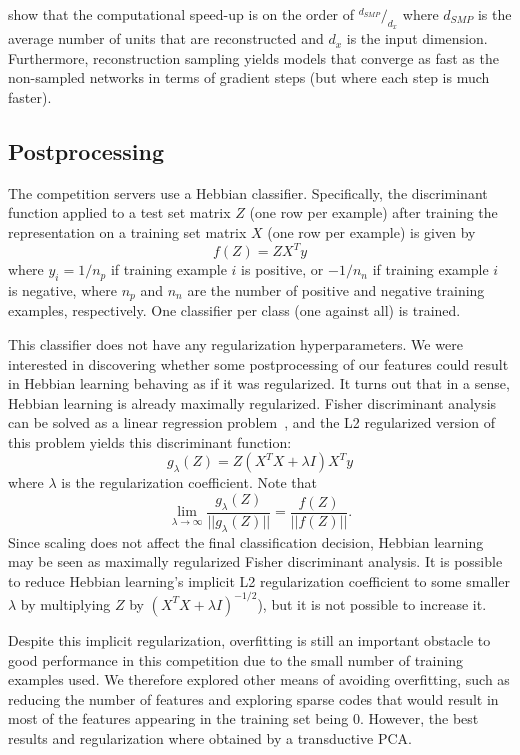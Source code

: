\cite{Dauphin+al-2011} show that the computational speed-up is on the order of
$^{d_{SMP}}/_{d_x}$ where $d_{SMP}$ is the average number of units that are
reconstructed and $d_x$ is the input dimension. Furthermore, reconstruction sampling
yields models that converge as fast as the non-sampled networks in terms of gradient steps
(but where each step is much faster).


\subsection{Postprocessing}

The competition servers use a Hebbian classifier. Specifically,
the discriminant function applied to a test set matrix 
$Z$ (one row per example) after training
the representation on a training set matrix $X$ (one row per example) is given by
\[ f(Z) = Z X^T y \]
where $y_i = 1 / n_p$ if training example $i$ is positive,
or $-1/n_n$ if training example $i$ is negative, where $n_p$ and $n_n$
are the number of positive and negative training examples, respectively.
One classifier per class (one against all) is trained.

This classifier does not have any regularization hyperparameters.
We were interested in discovering whether some postprocessing of our
features could result in Hebbian learning behaving as if it was regularized.
It turns out that in a sense, Hebbian learning is already maximally
regularized. Fisher discriminant analysis can be solved as a linear
regression problem~\citep{bishop-book2006}, and the L2 regularized version
of this problem yields this discriminant function:
\[ g_\lambda(Z) = Z (X^T X + \lambda I) X^T y \]
where $\lambda$ is the regularization coefficient. Note that
\[ \lim_{\lambda\rightarrow\infty} \frac{g_\lambda(Z)}{||g_\lambda(Z)||} = \frac{f(Z)}{||f(Z)||}. \]
Since scaling does not affect the final classification
decision, Hebbian learning may be seen as maximally regularized Fisher
discriminant analysis. It is possible to reduce Hebbian learning's implicit
L2 regularization coefficient 
to some smaller $\lambda$ by multiplying $Z$ by $(X^TX+\lambda I)^{-1/2}$),
but it is not possible to increase it.

Despite this implicit regularization, overfitting is still an important
obstacle to good performance in this competition
due to the small number of training examples used. We therefore explored
other means of avoiding overfitting, such as reducing the number of features
and exploring sparse codes that would result in most of the features
appearing in the training set being 0. However, the best results
and regularization where obtained by a transductive PCA.

